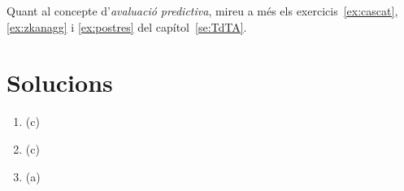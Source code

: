 Quant al concepte d'\emph{avaluació predictiva}, mireu a més els
exercicis~\ref{ex:cascat}, \ref{ex:zkanagg} i \ref{ex:postres} del capítol~\ref{se:TdTA}.


\section{Solucions}


\begin{enumerate}
\item (c)
\item (c)
\item (a)


\end{enumerate}


